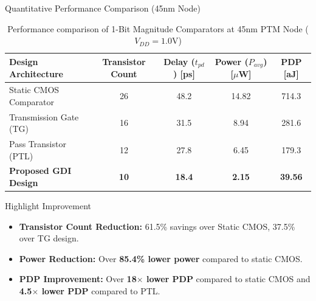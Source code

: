 \documentclass[aspectratio=169,10pt]{beamer}
\begin{document}
\begin{frame}{Quantitative Performance Comparison (45nm Node)}
  \begin{table}
    \centering
    \caption{Performance comparison of 1-Bit Magnitude Comparators at 45nm PTM Node ($V_{DD} = 1.0\text{V}$)}
    \small
    \begin{tabular}{lcccc}
      \toprule
      \textbf{Design Architecture} & \textbf{Transistor Count} & \textbf{Delay ($t_{pd}$) [ps]} & \textbf{Power ($P_{avg}$) [$\mu$W]} & \textbf{PDP [aJ]} \\
      \midrule
      Static CMOS Comparator & 26 & 48.2 & 14.82 & 714.3 \\
      Transmission Gate (TG) & 16 & 31.5 & 8.94 & 281.6 \\
      Pass Transistor (PTL)  & 12 & 27.8 & 6.45 & 179.3 \\
      \textbf{Proposed GDI Design} & \textbf{10} & \textbf{18.4} & \textbf{2.15} & \textbf{39.56} \\
      \bottomrule
    \end{tabular}
  \end{table}
  \pause
  \begin{exampleblock}{Highlight Improvement}
    \begin{itemize}
      \item \textbf{Transistor Count Reduction:} 61.5\% savings over Static CMOS, 37.5\% over TG design.
      \item \textbf{Power Reduction:} Over \textbf{85.4\% lower power} compared to static CMOS.
      \item \textbf{PDP Improvement:} Over \textbf{18$\times$ lower PDP} compared to static CMOS and \textbf{4.5$\times$ lower PDP} compared to PTL.
    \end{itemize}
  \end{exampleblock}
\end{frame}
\end{document}
